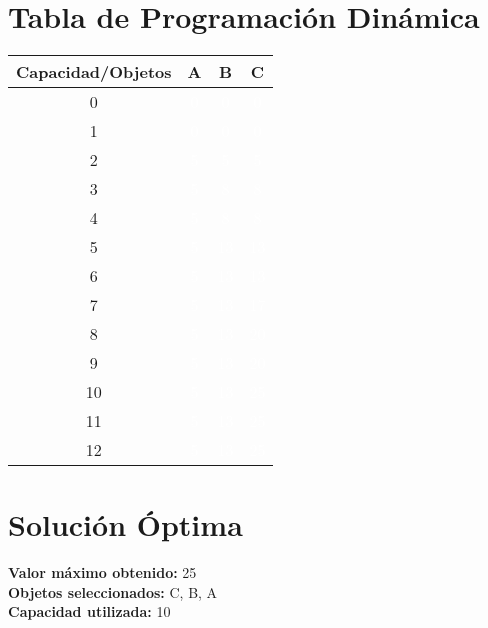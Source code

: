 \documentclass{article}
\begin{document}
\section*{Tabla de Programación Dinámica}
\begin{center}
\scriptsize
\begin{tabular}{|c|c|c|c|}
\hline
Capacidad/Objetos & A & B & C \\ \hline
0 & \cellcolor{rojo}\textcolor{white}{0} & \cellcolor{rojo}\textcolor{white}{0} & \cellcolor{rojo}\textcolor{white}{0} \\ \hline
1 & \cellcolor{rojo}\textcolor{white}{0} & \cellcolor{rojo}\textcolor{white}{0} & \cellcolor{rojo}\textcolor{white}{0} \\ \hline
2 & \cellcolor{verde}\textcolor{white}{5} & \cellcolor{rojo}\textcolor{white}{5} & \cellcolor{rojo}\textcolor{white}{5} \\ \hline
3 & \cellcolor{verde}\textcolor{white}{5} & \cellcolor{verde}\textcolor{white}{8} & \cellcolor{rojo}\textcolor{white}{8} \\ \hline
4 & \cellcolor{verde}\textcolor{white}{5} & \cellcolor{verde}\textcolor{white}{8} & \cellcolor{rojo}\textcolor{white}{8} \\ \hline
5 & \cellcolor{verde}\textcolor{white}{5} & \cellcolor{verde}\textcolor{white}{13} & \cellcolor{rojo}\textcolor{white}{13} \\ \hline
6 & \cellcolor{verde}\textcolor{white}{5} & \cellcolor{verde}\textcolor{white}{13} & \cellcolor{rojo}\textcolor{white}{13} \\ \hline
7 & \cellcolor{verde}\textcolor{white}{5} & \cellcolor{verde}\textcolor{white}{13} & \cellcolor{verde}\textcolor{white}{17} \\ \hline
8 & \cellcolor{verde}\textcolor{white}{5} & \cellcolor{verde}\textcolor{white}{13} & \cellcolor{verde}\textcolor{white}{20} \\ \hline
9 & \cellcolor{verde}\textcolor{white}{5} & \cellcolor{verde}\textcolor{white}{13} & \cellcolor{verde}\textcolor{white}{20} \\ \hline
10 & \cellcolor{verde}\textcolor{white}{5} & \cellcolor{verde}\textcolor{white}{13} & \cellcolor{verde}\textcolor{white}{25} \\ \hline
11 & \cellcolor{verde}\textcolor{white}{5} & \cellcolor{verde}\textcolor{white}{13} & \cellcolor{verde}\textcolor{white}{25} \\ \hline
12 & \cellcolor{verde}\textcolor{white}{5} & \cellcolor{verde}\textcolor{white}{13} & \cellcolor{verde}\textcolor{white}{25} \\ \hline
\end{tabular}
\end{center}
\normalsize

\section*{Solución Óptima}
\textbf{Valor máximo obtenido:} 25\\
\textbf{Objetos seleccionados:} C, B, A\\
\textbf{Capacidad utilizada:} 10\\
\end{document}
